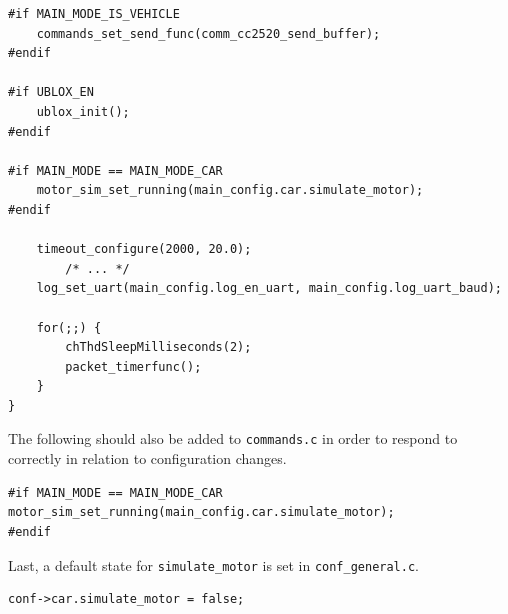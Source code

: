 \documentclass[12pt]{article} %
\begin{document}
{\begin{Verbatim}[samepage=true,frame=single,label=Embedded/RC\_Controller/main.c]
#if MAIN_MODE_IS_VEHICLE
	commands_set_send_func(comm_cc2520_send_buffer);
#endif

#if UBLOX_EN
	ublox_init();
#endif

#if MAIN_MODE == MAIN_MODE_CAR
	motor_sim_set_running(main_config.car.simulate_motor);
#endif

	timeout_configure(2000, 20.0);
        /* ... */
	log_set_uart(main_config.log_en_uart, main_config.log_uart_baud);

	for(;;) {
		chThdSleepMilliseconds(2);
		packet_timerfunc();
	}
}
\end{Verbatim}

The following should also be added to \verb!commands.c! in order to
respond to correctly in relation to configuration changes.

\begin{Verbatim}[samepage=true,frame=single,label=Embedded/RC\_Controller/commands.c]
#if MAIN_MODE == MAIN_MODE_CAR
motor_sim_set_running(main_config.car.simulate_motor);
#endif
\end{Verbatim}

Last, a default state for \verb!simulate_motor! is set in \verb!conf_general.c!.

\begin{Verbatim}[samepage=true,frame=single,label=Embedded/RC\_Controller/conf\_general.c]
conf->car.simulate_motor = false;
\end{Verbatim}









}
\end{document}
